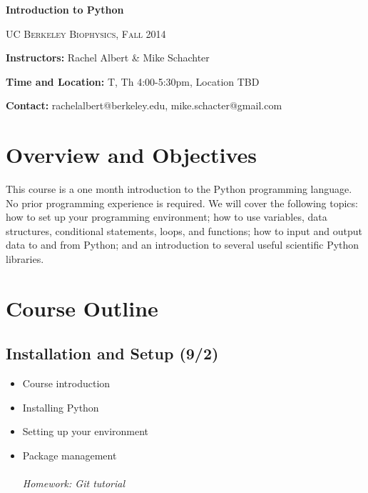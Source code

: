 \documentclass[12pt]{article}
\begin{document}
\thispagestyle{plain} %






\begin{center}
\LARGE{\bf{Introduction to Python}}

\textsc{UC Berkeley Biophysics, Fall 2014} \bigskip

\end{center}

\noindent\textbf{Instructors: }Rachel Albert \& Mike Schachter\medskip

\noindent\textbf{Time and Location:} T, Th 4:00-5:30pm, Location TBD\medskip

\noindent\textbf{Contact:} rachelalbert@berkeley.edu, mike.schacter@gmail.com\medskip

\bigskip

\section*{Overview and Objectives}%
This course is a one month introduction to the Python programming language. No prior programming experience is required. We will cover the following topics: how to set up your programming environment; how to use variables, data structures, conditional statements, loops, and functions; how to input and output data to and from Python; and an introduction to several useful scientific Python libraries.

\section*{Course Outline}

\subsection*{Installation and Setup \textnormal{\small{(9/2)} }}
\begin{itemize}
\item Course introduction
\item Installing Python
\item Setting up your environment
\item Package management \\\\
\it{Homework: Git tutorial}
\end{itemize}
\end{document}
